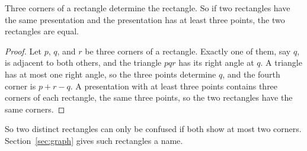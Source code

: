 \begin{lemma}\label{lem:threecorners}
Three corners of a rectangle determine the rectangle. So if two rectangles have the
same presentation and the presentation has at least three points, the two rectangles
are equal.
\end{lemma}

\begin{proof}
Let $p$, $q$, and $r$ be three corners of a rectangle. Exactly one of them, say $q$,
is adjacent to both others, and the triangle $pqr$ has its right angle at $q$. A
triangle has at most one right angle, so the three points determine $q$, and the
fourth corner is $p+r-q$. A presentation with at least three points contains three
corners of each rectangle, the same three points, so the two rectangles have the
same corners.
\end{proof}

So two distinct rectangles can only be confused if both show at most two corners.
Section~\ref{sec:graph} gives such rectangles a name.
